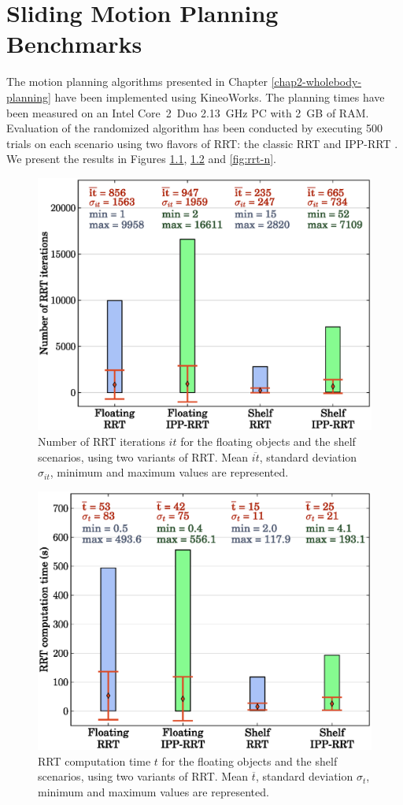 \chapter{Sliding Motion Planning Benchmarks}
\label{chap:app-sliding}

The motion planning algorithms presented in Chapter
\ref{chap2-wholebody-planning} have been implemented using
KineoWorks\texttrademark \cite{laumond2006kcs}. The planning times
have been measured on an Intel Core~2~Duo 2.13~GHz PC with 2~GB of
RAM. Evaluation of the randomized algorithm has been conducted by
executing 500 trials on each scenario using two flavors of RRT: the
classic RRT and IPP-RRT \cite{FERR04A}. We present the results in
Figures \ref{fig:rrt-it}, \ref{fig:rrt-t} and \ref{fig:rrt-n}.

\begin{figure}[h]
\centering
\includegraphics[width=0.7\linewidth]
                {src/appendix/plots/rrt-it.eps}
\caption{Number of RRT iterations $it$ for the floating objects and the
  shelf scenarios, using two variants of RRT. Mean $\overline{it}$,
  standard deviation $\sigma_{it}$, minimum and maximum values are
  represented.}
\label{fig:rrt-it}
\end{figure}

\begin{figure}
\centering
\includegraphics[width=0.7\linewidth]
                {src/appendix/plots/rrt-t.eps}
\caption{RRT computation time $t$ for the floating objects and the shelf
  scenarios, using two variants of RRT. Mean $\overline{t}$, standard
  deviation $\sigma_{t}$, minimum and maximum values are represented.}
\label{fig:rrt-t}
\end{figure}

